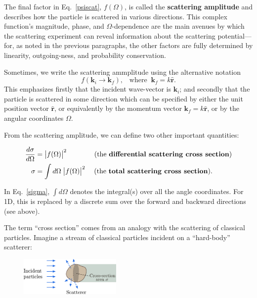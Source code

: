 \documentclass[pra,12pt]{revtex4-2}
\begin{document}
The final factor in Eq.~\eqref{psiscat}, $f(\Omega)$, is called the
\textbf{scattering amplitude} and describes how the particle is
scattered in various directions.  This complex function's magnitude,
phase, and $\Omega$-dependence are the main avenues by which the
scattering experiment can reveal information about the scattering
potential---for, as noted in the previous paragraphs, the other
factors are fully determined by linearity, outgoing-ness, and
probability conservation.

Sometimes, we write the scattering ammplitude using the alternative
notation
\begin{equation}
  f(\mathbf{k}_i \rightarrow \mathbf{k}_f), \;\;\;\mathrm{where}\;\; \mathbf{k}_f = k \hat{\mathbf{r}}.
\end{equation}
This emphasizes firstly that the incident wave-vector is
$\mathbf{k}_i$; and secondly that the particle is scattered in some
direction which can be specified by either the unit position vector
$\hat{\mathbf{r}}$, or equivalently by the momentum vector
$\mathbf{k}_f = k \hat{\mathbf{r}}$, or by the angular coordinates
$\Omega$.

From the scattering amplitude, we can define two other important
quantities:
\begin{framed}
  \begin{align}
    \frac{d\sigma}{d\Omega} &= \big|f(\Omega)\big|^2 \qquad\quad\quad \text{(the \textbf{differential scattering cross section})} \\ \sigma &= \int d\Omega\; \big|f(\Omega)\big|^2 \quad\; \text{(the \textbf{total scattering cross section}).} \label{sigma}
  \end{align}
\end{framed}
\vskip -0.1in
\noindent
In Eq.~\eqref{sigma}, $\int d\Omega$ denotes the integral(s) over all
the angle coordinates.  For 1D, this is replaced by a discrete sum
over the forward and backward directions (see above).

The term ``cross section'' comes from an analogy with the scattering
of classical particles.  Imagine a stream of classical particles
incident on a ``hard-body'' scatterer:

\begin{figure}[h]
  \centering\includegraphics[width=0.44\textwidth]{crosssection}
\end{figure}
\end{document}
